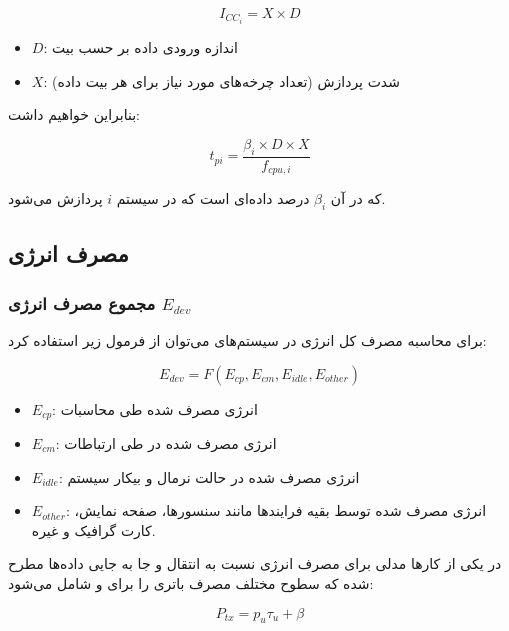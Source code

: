 \documentclass[a4paper]{article}
\begin{document}
\begin{equation}
    I_{CC_i} = X \times D
\end{equation}

\begin{itemize}
    \item $D$: اندازه ورودی داده بر حسب بیت
    \item $X$: شدت پردازش (تعداد چرخه‌های مورد نیاز برای هر بیت داده)
\end{itemize}

بنابراین خواهیم داشت:

\begin{equation}
    t_{pi} = \frac{\beta_i \times D \times X}{f_{cpu, i}}
\end{equation}

که در آن $\beta_{i}$ درصد داده‌‌ای است که در سیستم $i$ پردازش می‌شود.

\subsection{مصرف انرژی}

\subsubsection{مجموع مصرف انرژی $E_{dev}$}

برای محاسبه مصرف کل انرژی در سیستم‌های  می‌توان از فرمول زیر استفاده
کرد:

\begin{equation}
    E_{dev} = F(E_{cp}, E_{cm}, E_{idle}, E_{other})
\end{equation}

\begin{itemize}
    \item $E_{cp}$: انرژی مصرف شده طی محاسبات
    \item $E_{cm}$: انرژی مصرف شده در طی ارتباطات
    \item $E_{idle}$: انرژی مصرف شده در حالت نرمال و بیکار سیستم
    \item $E_{other}$: انرژی مصرف شده توسط بقیه فرایند‌ها مانند سنسور‌ها، صفحه
    نمایش، کارت گرافیک و غیره.
\end{itemize}

در یکی از کار‌ها \cite{huang2012close} مدلی برای مصرف انرژی نسبت به انتقال و جا
به جایی داده‌ها مطرح شده که سطوح مختلف مصرف باتری را برای  و
 شامل می‌شود:

\begin{equation}
    P_{tx} = p_{u}\tau_{u} + \beta
\end{equation}
\end{document}
